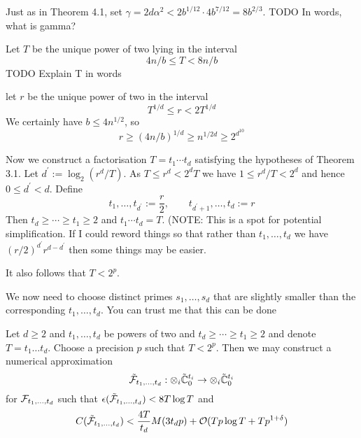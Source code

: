 Just as in Theorem 4.1, set $\gamma = 2d\alpha^2 < 2b^{1/12} \cdot 4b^{7/12} = 8b^{2/3}$. 
TODO In words, what is gamma?

Let $T$ be the unique power of two lying in the interval
\begin{equation}
    4n/b \leq T < 8n/b
\end{equation}
TODO Explain T in words

let $r$ be the unique power of two in the interval
\[
    T^{1/d} \leq r < 2T^{1/d}
\]
We certainly have $b \leq 4n^{1/2}$, so
\[
    r \geq (4n/b)^{1/d} \geq n^{1/2d} \geq 2^{d^{10}}
\]

Now we construct a factorisation $T = t_1 \cdots t_d$ satisfying the hypotheses of Theorem 3.1. Let $d^\prime := \log_2(r^d / T)$. As $T \leq r^d < 2^d T$ we have $1 \leq r^d / T < 2^d$ and hence $0 \leq d^\prime < d$. Define
\[
    t_1, \ldots, t_{d^\prime} := \frac{r}{2}, \qquad t_{d^\prime + 1} , \ldots, t_d := r
\]
Then $t_d \geq \cdots \geq t_1 \geq 2$ and $t_1\cdots t_d = T$.
(NOTE: This is a spot for potential simplification. If I could reword things so that rather than $t_1, \ldots, t_d$ we have $(r/2)^{d^\prime} r^{d-d^\prime}$ then some things may be easier.

It also follows that $T < 2^p$.

We now need to choose distinct primes $s_1, \ldots, s_d$ that are slightly smaller than the corresponding $t_1, \ldots, t_d$. You can trust me that this can be done

\begin{theorem}
    Let $d \geq 2$ and $t_1, \ldots, t_d$ be powers of two and $t_d \geq \cdots \geq t_1 \geq 2$ and denote $T = t_1 \ldots t_d$. Choose a precision $p$ such that $T < 2^p$. Then we may construct a numerical approximation
    \[
        \tilde {\mathcal F}_{t_1, \ldots, t_d} : \otimes_i \tilde{{\mathbb C}}^{t_i}_0 \to \otimes_i \tilde{{\mathbb C}}^{t_i}_0
    \]
    for $\mathcal F_{t_1, \ldots, t_d}$ such that $\epsilon(\tilde{\mathcal F}_{t_1, \ldots, t_d}) < 8 T \log T$ and
    \[
        C(\tilde{\mathcal F}_{t_1, \ldots, t_d}) < \frac{4T}{t_d} M(3t_d p) + \mathcal O(Tp\log T + Tp^{1 + \delta})
    \]
\end{theorem}

